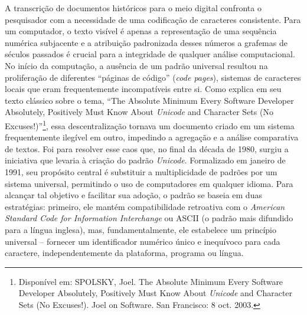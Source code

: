 \documentclass[portuguese]{textolivre}
\begin{document}
A transcrição de documentos históricos para o meio digital confronta o pesquisador com a necessidade de uma codificação de caracteres consistente. Para um computador, o texto visível é apenas a representação de uma sequência numérica subjacente e a atribuição padronizada desses números a grafemas de séculos passados é crucial para a integridade de qualquer análise computacional. No início da computação, a ausência de um padrão universal resultou na proliferação de diferentes “páginas de código” (\textit{code pages}), sistemas de caracteres locais que eram frequentemente incompatíveis entre si. Como explica \textcite{spolsky2003unicode} em seu texto clássico sobre o tema, “The Absolute Minimum Every Software Developer Absolutely, Positively Must Know About \textit{Unicode} and Character Sets (No Excuses!)”\footnote{Disponível em: SPOLSKY, Joel. The Absolute Minimum Every Software Developer Absolutely, Positively Must Know About \textit{Unicode} and Character Sets (No Excuses!). Joel on Software. San Francisco: 8 oct. 2003.}, essa descentralização tornava um documento criado em um sistema frequentemente ilegível em outro, impedindo a agregação e a análise comparativa de textos. Foi para resolver esse caos que, no final da década de 1980, surgiu a iniciativa que levaria à criação do padrão \textit{Unicode}. Formalizado em janeiro de 1991, seu propósito central é substituir a multiplicidade de padrões por um sistema universal, permitindo o uso de computadores em qualquer idioma. Para alcançar tal objetivo e facilitar sua adoção, o padrão se baseia em duas estratégias: primeiro, ele mantém compatibilidade retroativa com o \textit{American Standard Code for Information Interchange} ou ASCII (o padrão mais difundido para a língua inglesa), mas, fundamentalmente, ele estabelece um princípio universal – fornecer um identificador numérico único e inequívoco para cada caractere, independentemente da plataforma, programa ou língua.
\end{document}
